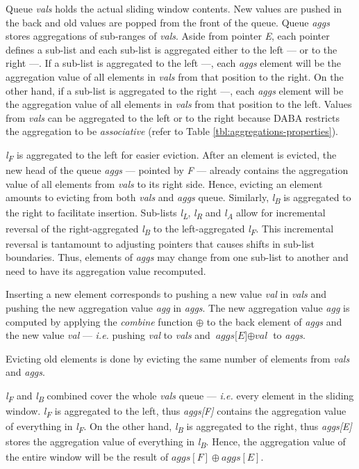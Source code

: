 Queue \textit{vals} holds the actual sliding window contents. New values are pushed in the back and old values are popped from the front of the queue. Queue \textit{aggs} stores aggregations of sub-ranges of \textit{vals}. Aside from pointer \textit{E}, each pointer defines a sub-list and each sub-list is aggregated either to the left \textbullet--- or to the right ---\textbullet. If a sub-list is aggregated to the left \textbullet---, each \textit{aggs} element will be the aggregation value of all elements in \textit{vals} from that position to the right. On the other hand, if a sub-list is aggregated to the right ---\textbullet, each \textit{aggs} element will be the aggregation value of all elements in \textit{vals} from that position to the left. Values from \textit{vals} can be aggregated to the left or to the right because DABA restricts the aggregation to be \textit{associative} (refer to Table \ref{tbl:aggregations-properties}).

\textit{l\textsubscript{F}} is aggregated to the left for easier eviction. After an element is evicted, the new head of the queue \textit{aggs} --- pointed by \textit{F} --- already contains the aggregation value of all elements from \textit{vals} to its right side. Hence, evicting an element amounts to evicting from both \textit{vals} and \textit{aggs} queue. Similarly, \textit{l\textsubscript{B}} is aggregated to the right to facilitate insertion. Sub-lists \textit{l\textsubscript{L}}, \textit{l\textsubscript{R}} and \textit{l\textsubscript{A}} allow for incremental reversal of the right-aggregated \textit{l\textsubscript{B}} to the left-aggregated \textit{l\textsubscript{F}}. This incremental reversal is tantamount to adjusting pointers that causes shifts in sub-list boundaries. Thus, elements of \textit{aggs} may change from one sub-list to another and need to have its aggregation value recomputed.

Inserting a new element corresponds to pushing a new value \textit{val} in \textit{vals} and pushing the new aggregation value \textit{agg} in \textit{aggs}. The new aggregation value \textit{agg} is computed by applying the \textit{combine} function $\oplus$ to the back element of \textit{aggs} and the new value \textit{val} --- \textit{i.e.} pushing \textit{val} to \textit{vals} and $\textit{aggs[E]} \oplus \textit{val}$ to \textit{aggs}. 

Evicting old elements is done by evicting the same number of elements from \textit{vals} and \textit{aggs}.

\textit{l\textsubscript{F}} and \textit{l\textsubscript{B}} combined cover the whole \textit{vals} queue --- \textit{i.e.} every element in the sliding window. \textit{l\textsubscript{F}} is aggregated to the left, thus \textit{aggs[F]} contains the aggregation value of everything in \textit{l\textsubscript{F}}. On the other hand, \textit{l\textsubscript{B}} is aggregated to the right, thus \textit{aggs[E]} stores the aggregation value of everything in \textit{l\textsubscript{B}}. Hence, the aggregation value of the entire window will be the result of \textit{$aggs[F] \oplus aggs[E]$}.


